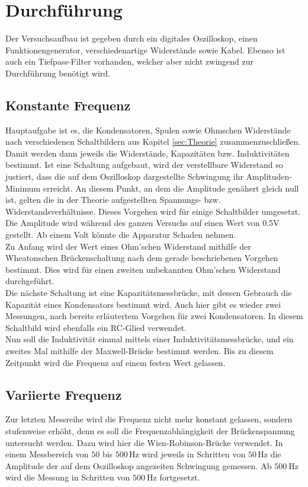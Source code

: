 \section{Durchführung}
\label{sec:Durchführung}
Der Versuchsaufbau ist gegeben durch ein digitales Oszilloskop, einen Funktionengenerator, verschiedenartige 
Widerstände sowie Kabel. Ebenso ist auch ein Tiefpass-Filter vorhanden, welcher aber nicht zwingend zur
Durchführung benötigt wird. 
\subsection{Konstante Frequenz}
Hauptaufgabe ist es, die Kondensatoren, Spulen sowie Ohmschen Widerstände
nach verschiedenen Schaltbildern aus Kapitel \ref{sec:Theorie} zusammenzuschließen. Damit werden dann jeweils die
Widerstände, Kapazitäten bzw. Induktivitäten bestimmt. Ist eine Schaltung aufgebaut, wird 
der verstellbare Widerstand so justiert, dass die auf dem Oszilloskop dargestellte Schwingung ihr Amplituden-Minimum erreicht. An diesem Punkt, an dem die Amplitude genähert gleich null ist, gelten 
die in der Theorie aufgestellten Spannungs- bzw. Widerstandsverhältnisse. Dieses Vorgehen wird
für einige Schaltbilder umgesetzt. Die Amplitude wird während des ganzen Versuchs auf einen Wert von 0.5V gestellt.
Ab einem Volt könnte die Apparatur Schaden nehmen. \\ \noindent 
Zu Anfang wird der Wert eines Ohm'schen Widerstand mithilfe der 
Wheatonschen Brückenschaltung nach dem gerade beschriebenen Vorgehen bestimmt. Dies wird für einen
zweiten unbekannten Ohm'schen Widerstand durchgeführt.\\ \noindent
Die nächste Schaltung ist eine Kapazitätsmessbrücke, mit dessen Gebrauch die Kapazität eines Kondensators
bestimmt wird. Auch hier gibt es wieder zwei Messungen, nach bereits erläutertem Vorgehen für zwei Kondensatoren.
In diesem Schaltbild wird ebenfalls ein RC-Glied verwendet.
\\
Nun soll die Induktivität einmal mittels einer Induktivitätsmessbrücke, und ein zweites Mal mithilfe der Maxwell-Brücke
bestimmt werden. Bis zu diesem Zeitpunkt wird die Frequenz auf einem festen Wert gelassen. 
\subsection{Variierte Frequenz}
Zur letzten Messreihe wird die Frequenz nicht mehr konstant gelassen, sondern stufenweise erhöht, denn es soll die 
Frequenzabhängigkeit der Brückenspannung untersucht werden. Dazu wird hier die Wien-Robinson-Brücke 
verwendet. In einem Messbereich von $50$ bis $500$\,Hz wird jeweils in Schritten von $50$\,Hz die Amplitude der 
auf dem Oszilloskop angezeiten Schwingung gemessen. Ab $\qty{500}{\hertz}$ wird die Messung in Schritten von 
$\qty{500}{\hertz}$ fortgesetzt. 

